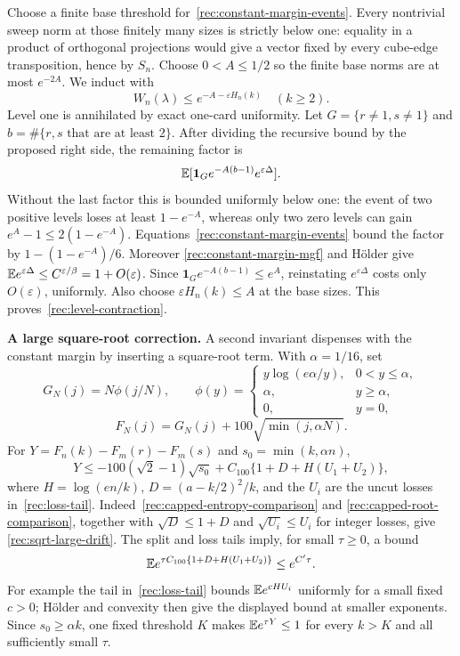 Choose a finite base threshold for~\eqref{rec:constant-margin-events}.
Every nontrivial sweep norm at those finitely many sizes is strictly below
one: equality in a product of orthogonal projections would give a vector
fixed by every cube-edge transposition, hence by $S_n$.  Choose
$0<A\le1/2$ so the finite base norms are at most $e^{-2A}$.
We induct with
\begin{equation}\label{rec:constant-margin-invariant}
 W_n(\lambda)\le e^{-A-\varepsilon H_n(k)}\quad(k\ge2).
\end{equation}
Level one is annihilated by exact one-card uniformity.  Let
$G=\{r\ne1,s\ne1\}$ and $b=\#\{r,s\text{ that are at least }2\}$.
After dividing the recursive bound by the proposed right side, the
remaining factor is
\[
 \mathbb E[\mathbf1_G e^{-A(b-1)}e^{\varepsilon\Delta}].
\]
Without the last factor this is bounded uniformly below one: the event
of two positive levels loses at least $1-e^{-A}$, whereas only two zero
levels can gain $e^A-1\le2(1-e^{-A})$.
Equations~\eqref{rec:constant-margin-events} bound the factor by
$1-(1-e^{-A})/6$.  Moreover
\eqref{rec:constant-margin-mgf} and H\"older give
$\mathbb E e^{\varepsilon\Delta}\le C^{\varepsilon/\beta}=1+O(\varepsilon)$.
Since $\mathbf1_Ge^{-A(b-1)}\le e^A$, reinstating
$e^{\varepsilon\Delta}$ costs only $O(\varepsilon)$, uniformly.
Also choose $\varepsilon H_n(k)\le A$
at the base sizes.  This proves~\eqref{rec:level-contraction}.

\medskip\noindent\textbf{A large square-root correction.}\enspace
A second invariant dispenses with the constant margin by inserting a
square-root term.  With $\alpha=1/16$, set
\[
 G_N(j)=N\phi(j/N),\qquad
 \phi(y)=\begin{cases}y\log(e\alpha/y),&0<y\le\alpha,\\
 \alpha,&y\ge\alpha,\\0,&y=0,\end{cases}
\]
\[
 F_N(j)=G_N(j)+100\sqrt{\min(j,\alpha N)}.
\]
For $Y=F_n(k)-F_m(r)-F_m(s)$ and $s_0=\min(k,\alpha n)$,
\begin{equation}\label{rec:sqrt-large-drift}
 Y\le-100(\sqrt2-1)\sqrt{s_0}
       +C_{100}\{1+D+H(U_1+U_2)\},
\end{equation}
where $H=\log(en/k)$, $D=(a-k/2)^2/k$, and the $U_i$ are the
uncut losses in~\eqref{rec:loss-tail}.
Indeed~\eqref{rec:capped-entropy-comparison} and
\eqref{rec:capped-root-comparison}, together with
$\sqrt D\le1+D$ and $\sqrt{U_i}\le U_i$ for integer losses, give
\eqref{rec:sqrt-large-drift}.  The split and loss tails imply, for small
$\tau\ge0$, a bound
\[
 \mathbb E e^{\tau C_{100}\{1+D+H(U_1+U_2)\}}\le e^{C'\tau}.
\]
For example the tail in~\eqref{rec:loss-tail} bounds
$\mathbb E e^{cHU_i}$ uniformly for a small fixed $c>0$; H\"older and
convexity then give the displayed bound at smaller exponents.
Since $s_0\ge\alpha k$, one fixed threshold $K$ makes
$\mathbb E e^{\tau Y}\le1$ for every $k>K$ and all sufficiently small $\tau$.

